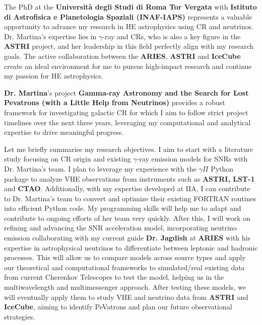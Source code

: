 \vspace{0.3cm}

\vspace{0.10 cm}

The PhD at the \textbf{Università degli Studi di Roma Tor Vergata} with \textbf{Istituto di Astrofisica e Planetologia Spaziali (INAF-IAPS)} represents a valuable opportunity to advance my research in HE astrophysics using CR and neutrinos. Dr. Martina’s expertise lies in $\gamma$-ray and CRs, who is also a key figure in the \textbf{ASTRI} project, and her leadership in this field perfectly align with my research goals. The active collaboration between the \textbf{ARIES}, \textbf{ASTRI} and \textbf{IceCube} create an ideal environment for me to pursue high-impact research and continue my passion for HE astrophysics.


\vspace{0.3cm}

\vspace{0.10 cm}
\textbf{Dr. Martina}'s project \textbf{Gamma-ray Astronomy and the Search for Lost Pevatrons (with a Little Help from Neutrinos)} provides a robust framework for investigating galactic CR for which I aim to follow strict project timelines over the next three years, leveraging my computational and analytical expertise to drive meaningful progress.

\vspace{0.10 cm}
Let me briefly summarise my research objectives. I aim to start with a literature study focusing on CR origin and existing $\gamma$-ray emission models for SNRs with Dr. Martina's team. I plan to leverage my experience with the $\gamma \Pi$ Python package to analyze VHE observations from instruments such as \textbf{ASTRI, LST-1} and \textbf{CTAO}. Additionally, with my expertise developed at IIA, I can contribute to Dr. Martina's team to convert and optimize their existing FORTRAN routines into efficient Python code. My programming skills will help me to adapt and contribute to ongoing efforts of her team very quickly. After this, I will work on refining and advancing the SNR acceleration model, incorporating neutrino emission collaborating with my current guide \textbf{Dr. Jagdish} at \textbf{ARIES} with his expertise in astrophysical neutrinos to differentiate between leptonic and hadronic processes. This will allow us to compare models across source types and apply our theoretical and computational frameworks to simulated/real existing data from current Cherenkov Telescopes to test the model, helping us in the multiwavelength and multimessenger approach. After testing these models, we will eventually apply them to study VHE and neutrino data from \textbf{ASTRI} and \textbf{IceCube}, aiming to identify PeVatrons and plan our future observational strategies.

